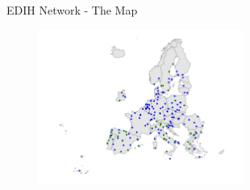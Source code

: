 \documentclass{beamer}
\begin{document}
\begin{frame}{EDIH Network - The Map}
    \begin{figure}
        \centering
        \includegraphics[width=0.6\textwidth, trim={160 23 80 0}, clip]{../Output/EDIH_and_Seal_of_Excellence_map.pdf}
    \end{figure}
\end{frame}
\end{document}
